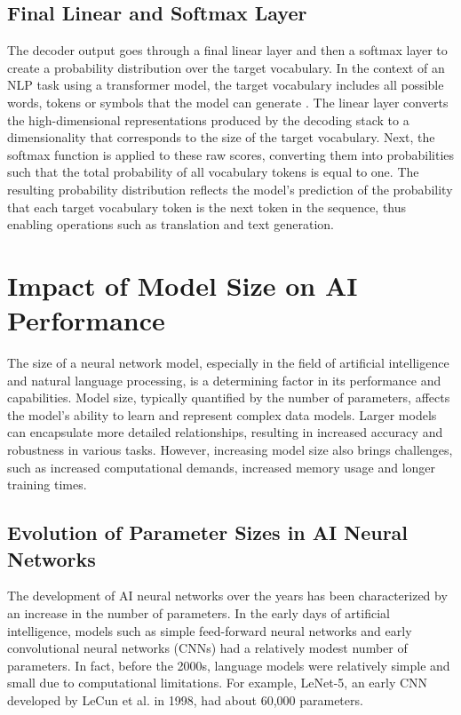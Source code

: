 \subsection{Final Linear and Softmax Layer}

The decoder output goes through a final linear layer and then a softmax layer to create a probability distribution over the target vocabulary. In the context of an NLP task using a transformer model, the target vocabulary includes all possible words, tokens or symbols that the model can generate \cite{jozefowicz2016exploring}. The linear layer converts the high-dimensional representations produced by the decoding stack to a dimensionality that corresponds to the size of the target vocabulary. Next, the softmax function is applied to these raw scores, converting them into probabilities such that the total probability of all vocabulary tokens is equal to one. The resulting probability distribution reflects the model's prediction of the probability that each target vocabulary token is the next token in the sequence, thus enabling operations such as translation and text generation.

\section{Impact of Model Size on AI Performance}

The size of a neural network model, especially in the field of artificial intelligence and natural language processing, is a determining factor in its performance and capabilities. Model size, typically quantified by the number of parameters, affects the model's ability to learn and represent complex data models. Larger models can encapsulate more detailed relationships, resulting in increased accuracy and robustness in various tasks. However, increasing model size also brings challenges, such as increased computational demands, increased memory usage and longer training times.

\subsection{Evolution of Parameter Sizes in AI Neural Networks}

The development of AI neural networks over the years has been characterized by an increase in the number of parameters. In the early days of artificial intelligence, models such as simple feed-forward neural networks and early convolutional neural networks (CNNs) had a relatively modest number of parameters. In fact, before the 2000s, language models were relatively simple and small due to computational limitations. For example, LeNet-5, an early CNN developed by LeCun et al. \cite{lecun1998gradient} in 1998, had about 60,000 parameters. 

